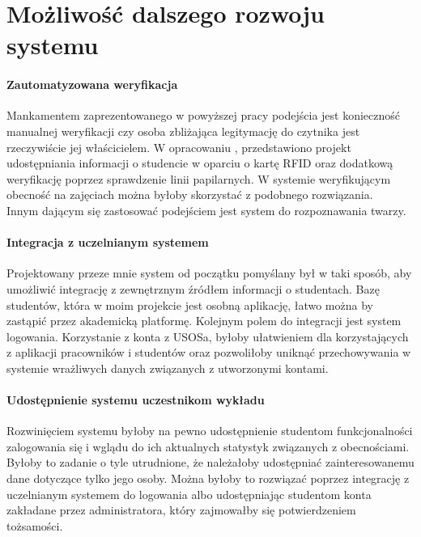 \documentclass[declaration,shortabstract, mgr]{iithesis}
\begin{document}
\chapter{Możliwość dalszego rozwoju systemu}
\subsubsection{Zautomatyzowana weryfikacja}
\indent Mankamentem zaprezentowanego w powyższej pracy podejścia jest konieczność manualnej weryfikacji czy osoba zbliżająca legitymację do czytnika jest rzeczywiście jej właścicielem. W opracowaniu \cite{fingerprint}, przedstawiono projekt udostępniania informacji o studencie w oparciu o kartę RFID oraz dodatkową weryfikację poprzez sprawdzenie linii papilarnych. W systemie weryfikującym obecność na zajęciach można byłoby skorzystać z podobnego rozwiązania.\\
\indent Innym dającym się zastosować podejściem jest system do rozpoznawania twarzy.
\subsubsection{Integracja z uczelnianym systemem}
\indent Projektowany przeze mnie system od początku pomyślany był w taki sposób, aby umożliwić integrację z zewnętrznym źródłem informacji o studentach. Bazę studentów, która w moim projekcie jest osobną aplikację, łatwo można by zastąpić przez akademicką platformę. Kolejnym polem do integracji jest system logowania. Korzystanie z konta z USOSa, byłoby ułatwieniem dla korzystających z aplikacji pracowników i studentów oraz pozwoliłoby uniknąć przechowywania w systemie wrażliwych danych związanych z utworzonymi kontami.
\subsubsection{Udostępnienie systemu uczestnikom wykładu}
\indent Rozwinięciem systemu byłoby na pewno udostępnienie studentom funkcjonalności zalogowania się i wglądu do ich aktualnych statystyk związanych z obecnościami. Byłoby to zadanie o tyle utrudnione, że należałoby udostępniać zainteresowanemu dane dotyczące tylko jego osoby. Można byłoby to rozwiązać poprzez integrację z uczelnianym systemem do logowania albo udostępniając studentom konta zakładane przez administratora, który zajmowałby się potwierdzeniem tożsamości.
\end{document}
